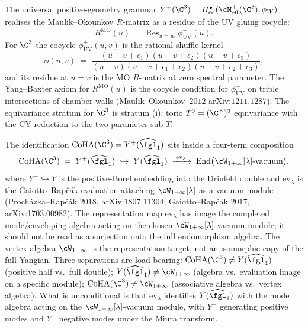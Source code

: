 \begin{remark}
\label{rem:sv-c3-mo-r-matrix-residue}
The universal positive-geometry grammar
$Y^+(\C^3) = H^\bullet_{\mathrm{eq}}(\cM^+_{\mathrm{eff}}(\C^3), \phi_W)$
realises the Maulik--Okounkov $R$-matrix as a residue of the UV
gluing cocycle:
\[
 R^{\mathrm{MO}}(u)
 \;=\; \mathrm{Res}_{u = u_*}\, \phi^+_{\mathrm{UV}}(u).
\]
For $\C^3$ the cocycle $\phi^+_{\mathrm{UV}}(u, v)$ is the rational
shuffle kernel
\[
 \phi(u, v) \;=\; \frac{(u - v + \epsilon_1)(u - v + \epsilon_2)
 (u - v + \epsilon_3)}{(u - v)(u - v + \epsilon_1 + \epsilon_2)
 (u - v + \epsilon_2 + \epsilon_3)},
\]
and its residue at $u = v$ is the MO $R$-matrix at zero spectral
parameter. The Yang--Baxter axiom for $R^{\mathrm{MO}}(u)$ is the
cocycle condition for $\phi^+_{\mathrm{UV}}$ on triple intersections
of chamber walls (Maulik--Okounkov~$2012$ arXiv:$1211.1287$). The equivariance stratum
for $\C^3$ is stratum (i): toric $T^3 = (\C^\times)^3$ equivariance
with the CY reduction to the two-parameter sub-$T$.
\end{remark}

\begin{remark}
\label{rem:evaluation-chain-c3}
The identification $\mathrm{CoHA}(\C^3) = Y^+(\widehat{\fgl}_1)$ sits
inside a four-term composition
\begin{equation}
\label{eq:c3-evaluation-chain}
 \mathrm{CoHA}(\C^3)
 \;=\; Y^+(\widehat{\fgl}_1)
 \;\hookrightarrow\; Y(\widehat{\fgl}_1)
 \;\xrightarrow{\;\mathrm{ev}_\lambda\;}\;
 \mathrm{End}\bigl(\cW_{1+\infty}[\lambda]\text{-vacuum}\bigr),
\end{equation}
where $Y^+ \hookrightarrow Y$ is the positive-Borel embedding into the
Drinfeld double and $\mathrm{ev}_\lambda$ is the Gaiotto--Rap\v{c}\'ak
evaluation attaching $\cW_{1+\infty}[\lambda]$ as a vacuum module
(Proch\'azka--Rap\v{c}\'ak $2018$, \textup{arXiv:1807.11304};
Gaiotto--Rap\v{c}\'ak $2017$, \textup{arXiv:1703.00982}). The
representation map $\mathrm{ev}_\lambda$ has image the completed
mode/enveloping algebra acting on the chosen
$\cW_{1+\infty}[\lambda]$ vacuum module; it should not be read as a
surjection onto the full endomorphism algebra. The vertex algebra
$\cW_{1+\infty}$ is the representation target, not an isomorphic copy of
the full Yangian.
Three separations are load-bearing: $\mathrm{CoHA}(\C^3) \neq
Y(\widehat{\fgl}_1)$ (positive half vs.\ full double);
$Y(\widehat{\fgl}_1) \neq \cW_{1+\infty}$ (algebra vs.\ evaluation
image on a specific module); $\mathrm{CoHA}(\C^3) \neq \cW_{1+\infty}$
(associative algebra vs.\ vertex algebra). What is unconditional is
that $\mathrm{ev}_\lambda$ identifies $Y(\widehat{\fgl}_1)$ with the
mode algebra acting on the $\cW_{1+\infty}[\lambda]$-vacuum module,
with $Y^+$ generating positive modes and $Y^-$ negative modes under
the Miura transform.
\end{remark}

